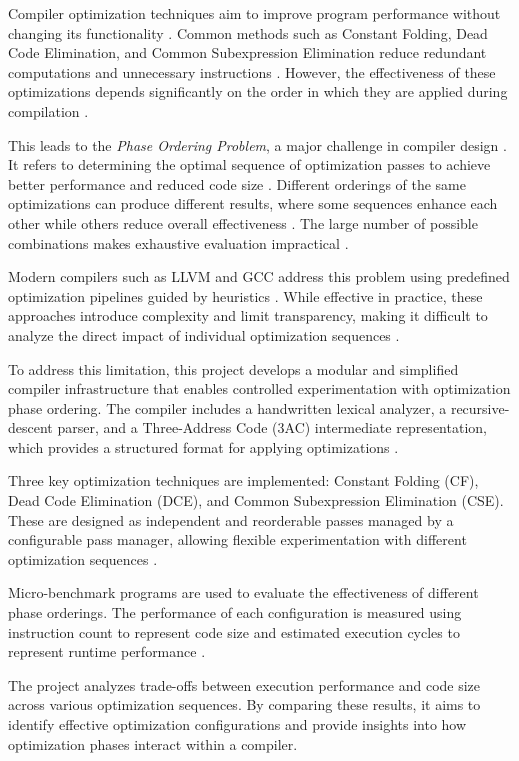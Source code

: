 \documentclass[conference]{IEEEtran}
\begin{document}
Compiler optimization techniques aim to improve program performance without changing its functionality \cite{ref21}. Common methods such as Constant Folding, Dead Code Elimination, and Common Subexpression Elimination reduce redundant computations and unnecessary instructions \cite{ref18}. However, the effectiveness of these optimizations depends significantly on the order in which they are applied during compilation \cite{ref19}.

This leads to the \textit{Phase Ordering Problem}, a major challenge in compiler design \cite{ref1}. It refers to determining the optimal sequence of optimization passes to achieve better performance and reduced code size \cite{ref2}. Different orderings of the same optimizations can produce different results, where some sequences enhance each other while others reduce overall effectiveness \cite{ref19}. The large number of possible combinations makes exhaustive evaluation impractical \cite{ref2}.

Modern compilers such as LLVM and GCC address this problem using predefined optimization pipelines guided by heuristics \cite{ref16}. While effective in practice, these approaches introduce complexity and limit transparency, making it difficult to analyze the direct impact of individual optimization sequences \cite{ref16}.

To address this limitation, this project develops a modular and simplified compiler infrastructure that enables controlled experimentation with optimization phase ordering. The compiler includes a handwritten lexical analyzer, a recursive-descent parser, and a Three-Address Code (3AC) intermediate representation, which provides a structured format for applying optimizations \cite{ref18}.

Three key optimization techniques are implemented: Constant Folding (CF), Dead Code Elimination (DCE), and Common Subexpression Elimination (CSE). These are designed as independent and reorderable passes managed by a configurable pass manager, allowing flexible experimentation with different optimization sequences \cite{ref19}.

Micro-benchmark programs are used to evaluate the effectiveness of different phase orderings. The performance of each configuration is measured using instruction count to represent code size and estimated execution cycles to represent runtime performance \cite{ref10}.

The project analyzes trade-offs between execution performance and code size across various optimization sequences. By comparing these results, it aims to identify effective optimization configurations and provide insights into how optimization phases interact within a compiler.
\end{document}
